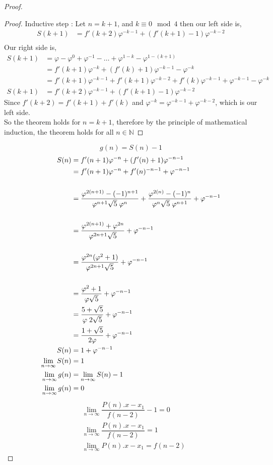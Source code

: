 \documentclass{article}
\begin{document}
\begin{proof}
\begin{proof}
	Inductive step : Let $n = k + 1$, and $k \equiv0\mod4$ then our left side is,
	\begin{align*}
	S(k + 1) &= f'(k+2)\varphi^{-k-1} + (f'(k+1)-1)\varphi^{-k-2}\\
	\end{align*}
	Our right side is,
	\begin{align*}
		S(k + 1) &= \varphi - \varphi^0 + \varphi^{-1} - \ldots + \varphi^{1 - k} - \varphi^{1 - (k + 1)}\\
		&= f'(k + 1)\varphi^{-k} + (f'(k) + 1)\varphi^{-k-1} - \varphi^{-k}\\
		&= f'(k + 1)\varphi^{-k-1} + f'(k+1)\varphi^{-k-2}+f'(k)\varphi^{-k-1}+\varphi^{-k-1}-\varphi^{-k}\\
		S(k + 1) &= f'(k+2)\varphi^{-k-1} + (f'(k+1)-1)\varphi^{-k-2}
	\end{align*}
	Since $f'(k+2) = f'(k+1)+f'(k)$ and $\varphi^{-k} = \varphi^{-k-1}+\varphi^{-k-2}$,
	which is our left side.\\
	So the theorem holds for $n = k + 1$, therefore by the principle of mathematical induction, the theorem holds for all $n \in \mathbb{N}$
\end{proof}
$$g(n) = S(n) - 1$$
\begin{align*}
	S(n) &= f'(n+1)\varphi^{-n} + (f'(n) + 1)\varphi^{-n-1}\\
	&= f'(n+1)\varphi^{-n}+f'(n)^{-n-1}+\varphi^{-n-1}\\\\
	&= \dfrac{\varphi^{2(n+1)}-(-1)^{n+1}}{\varphi^{n+1}\sqrt{5}\hspace{1mm}\varphi^n} + \dfrac{\varphi^{2(n)}-(-1)^{n}}{\varphi^{n}\sqrt{5}\hspace{1mm}\varphi^{n+1}} + \varphi^{-n-1}\\\\
	&= \dfrac{\varphi^{2(n+1)}+\varphi^{2n}}{\varphi^{2n+1}\sqrt{5}}+ \varphi^{-n-1}\\\\
	&= \dfrac{\varphi^{2n}(\varphi^2+1)}{\varphi^{2n+1}\sqrt{5}}+\varphi^{-n-1}\\\\
	&=\dfrac{\varphi^2+1}{\varphi\sqrt{5}}+\varphi^{-n-1}\\
	&= \dfrac{5+\sqrt{5}}{\varphi\hspace{1mm}2\sqrt{5}}+\varphi^{-n-1}\\
	&= \dfrac{1+\sqrt{5}}{2\varphi}+\varphi^{-n-1}\\
	S(n) &= 1 + \varphi^{-n-1}\\
	\lim_{n \to \infty} S(n) &= 1\\
	\lim_{n \to \infty} g(n) &= \lim_{n \to \infty} S(n) - 1\\
	\lim_{n \to \infty} g(n) &= 0\\
\end{align*}
\begin{align*}
	&\lim_{n \to \infty} \dfrac{P(n).x - x_1}{f(n - 2)} - 1 = 0\\
	&\lim_{n \to \infty} \dfrac{P(n).x - x_1}{f(n - 2)} = 1\\
	&\lim_{n \to \infty} P(n).x -x_1 = f(n-2)
\end{align*}
\end{proof}
\end{document}
